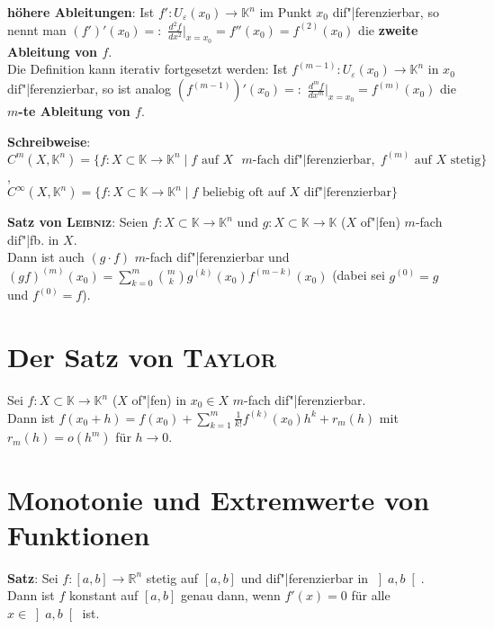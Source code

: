 \textbf{höhere Ableitungen}:
Ist $f': U_\varepsilon(x_0) \rightarrow \mathbb{K}^n$ im Punkt $x_0$
dif"|ferenzierbar, so nennt man
$(f')'(x_0) =:$ {\large $\frac{d^2 f}{dx^2}$}$\big|_{x=x_0} = f''(x_0) =
f^{(2)}(x_0)$ die \textbf{zweite Ableitung von $f$}. \\
Die Definition kann iterativ fortgesetzt werden:
Ist $f^{(m-1)}: U_\varepsilon(x_0) \rightarrow \mathbb{K}^n$ in $x_0$
dif"|ferenzierbar, so ist analog
$(f^{(m-1)})'(x_0) =:$ {\large $\frac{d^m f}{dx^m}$}$\big|_{x=x_0} =
f^{(m)}(x_0)$ die \textbf{$m$-te Ableitung von $f$}.

\textbf{Schreibweise}: \\
$C^m(X, \mathbb{K}^n) = \{f: X \subset \mathbb{K} \rightarrow \mathbb{K}^n
\;|\; f \text{ auf } X \text{ } m \text{-fach dif"|ferenzierbar},\;
f^{(m)} \text{ auf } X \text{ stetig}\}$, \\
$C^\infty(X, \mathbb{K}^n) = \{f: X \subset \mathbb{K} \rightarrow \mathbb{K}^n
\;|\; f \text{ beliebig oft auf } X \text{ dif"|ferenzierbar}\}$

\textbf{Satz von \textsc{Leibniz}}:
Seien $f: X \subset \mathbb{K} \rightarrow \mathbb{K}^n$ und
$g: X \subset \mathbb{K} \rightarrow \mathbb{K}$ ($X$ of"|fen)
$m$-fach dif"|fb. in $X$. \\
Dann ist auch $(g \cdot f)$ $m$-fach dif"|ferenzierbar und
$(gf)^{(m)}(x_0) = \sum_{k=0}^m \binom{m}{k} g^{(k)}(x_0) f^{(m-k)}(x_0)$
(dabei sei $g^{(0)} = g$ und $f^{(0)} = f$).

\section{%
    Der Satz von \textsc{Taylor}%
}

Sei $f: X \subset \mathbb{K} \rightarrow \mathbb{K}^n$ ($X$ of"|fen)
in $x_0 \in X$ $m$-fach dif"|ferenzierbar. \\
Dann ist $f(x_0 + h) = f(x_0) + \sum_{k=1}^m \frac{1}{k!} f^{(k)}(x_0) h^k +
r_m(h)$ mit $r_m(h) = o(h^m)$ für $h \to 0$.

\section{%
    Monotonie und Extremwerte von Funktionen%
}

\textbf{Satz}:
Sei $f: [a,b] \rightarrow \mathbb{R}^n$ stetig auf $[a,b]$ und dif"|ferenzierbar
in $\left]a,b\right[$. \\
Dann ist $f$ konstant auf $[a,b]$ genau dann, wenn $f'(x) = 0$ für alle
$x \in \left]a,b\right[$ ist.


